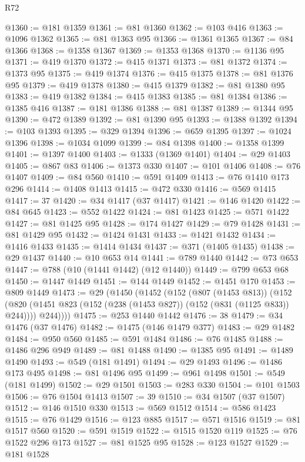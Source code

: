 \begin{lexlean}{R72}
\begin{coremodule}
@1360 := @181 @1359
@1361 := @81 @1360
@1362 := @103 @416
@1363 := @1096 @1362
@1365 := @81 @1363 @95
@1366 := @1361 @1365
@1367 := @84 @1366
@1368 := @1358 @1367
@1369 := @1353 @1368
@1370 := @1136 @95
@1371 := @419 @1370
@1372 := @415 @1371
@1373 := @81 @1372
@1374 := @1373 @95
@1375 := @419 @1374
@1376 := @415 @1375
@1378 := @81 @1376 @95
@1379 := @419 @1378
@1380 := @415 @1379
@1382 := @81 @1380 @95
@1383 := @419 @1382
@1384 := @415 @1383
@1385 := @81 @1384
@1386 := @1385 @416
@1387 := @181 @1386
@1388 := @81 @1387
@1389 := @1344 @95
@1390 := @472 @1389
@1392 := @81 @1390 @95
@1393 := @1388 @1392
@1394 := @103 @1393
@1395 := @329 @1394
@1396 := @659 @1395
@1397 := @1024 @1396
@1398 := @1034 @1099
@1399 := @84 @1398
@1400 := @1358 @1399
@1401 := @1397 @1400
@1403 := @1333 (@1369 @1401)
@1404 := @29 @1403
@1405 := @867 @83
@1406 := @1373 @330
@1407 := @101 @1406
@1408 := @76 @1407
@1409 := @84 @560
@1410 := @591 @1409
@1413 := @76 @1410 @173 @296
@1414 := @1408 @1413
@1415 := @472 @330
@1416 := @569 @1415
@1417 := 37
@1420 := @34 @1417 (@37 @1417)
@1421 := @146 @1420
@1422 := @84 @645
@1423 := @552 @1422
@1424 := @81 @1423
@1425 := @571 @1422
@1427 := @81 @1425 @95
@1428 := @174 @1427
@1429 := @79 @1428
@1431 := @81 @1429 @95
@1432 := @1424 @1431
@1433 := @1421 @1432
@1434 := @1416 @1433
@1435 := @1414 @1434
@1437 := @371 (@1405 @1435)
@1438 := @29 @1437
@1440 := @10 @653 @14
@1441 := @789 @1440
@1442 := @73 @653
@1447 := @788 (@10 (@1441 @1442) (@12 @1440))
@1449 := @799 @653 @68
@1450 := @1447 @1449
@1451 := @144 @1449
@1452 := @1451 @170
@1453 := @809 @1449
@1473 := @29
    (@1450
      (@1452
        (@152
          (@807 (@1453 @813))
          (@152
            (@820 (@1451 @823 (@152 (@238 (@1453 @827)) (@152 (@831 (@1125 @833)) @244))))
            @244))))
@1475 := @253 @1440 @1442
@1476 := 38
@1479 := @34 @1476 (@37 @1476)
@1482 := @1475 (@146 @1479 @377)
@1483 := @29 @1482
@1484 := @950 @560
@1485 := @591 @1484
@1486 := @76 @1485
@1488 := @1486 @296 @949
@1489 := @81 @1488
@1490 := @1385 @95
@1491 := @1489 @1490
@1493 := @549 (@181 @1491)
@1494 := @29 @1493
@1496 := @1486 @173 @495
@1498 := @81 @1496 @95
@1499 := @961 @1498
@1501 := @549 (@181 @1499)
@1502 := @29 @1501
@1503 := @283 @330
@1504 := @101 @1503
@1506 := @76 @1504 @1413
@1507 := 39
@1510 := @34 @1507 (@37 @1507)
@1512 := @146 @1510 @330
@1513 := @569 @1512
@1514 := @586 @1423
@1515 := @76 @1429
@1516 := @123 @885
@1517 := @571 @1516
@1519 := @81 @1517 @560
@1520 := @591 @1519
@1522 := @1515 @1520 @119
@1525 := @76 @1522 @296 @173
@1527 := @81 @1525 @95
@1528 := @123 @1527
@1529 := @181 @1528

\end{coremodule}
\end{lexlean}

